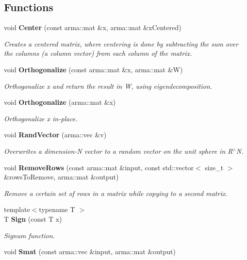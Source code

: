 \subsection*{Functions}
\begin{DoxyCompactItemize}
\item 
void \textbf{ Center} (const arma\+::mat \&x, arma\+::mat \&x\+Centered)
\begin{DoxyCompactList}\small\item\em Creates a centered matrix, where centering is done by subtracting the sum over the columns (a column vector) from each column of the matrix. \end{DoxyCompactList}\item 
void \textbf{ Orthogonalize} (const arma\+::mat \&x, arma\+::mat \&W)
\begin{DoxyCompactList}\small\item\em Orthogonalize x and return the result in W, using eigendecomposition. \end{DoxyCompactList}\item 
void \textbf{ Orthogonalize} (arma\+::mat \&x)
\begin{DoxyCompactList}\small\item\em Orthogonalize x in-\/place. \end{DoxyCompactList}\item 
void \textbf{ Rand\+Vector} (arma\+::vec \&v)
\begin{DoxyCompactList}\small\item\em Overwrites a dimension-\/N vector to a random vector on the unit sphere in R$^\wedge$N. \end{DoxyCompactList}\item 
void \textbf{ Remove\+Rows} (const arma\+::mat \&input, const std\+::vector$<$ size\+\_\+t $>$ \&rows\+To\+Remove, arma\+::mat \&output)
\begin{DoxyCompactList}\small\item\em Remove a certain set of rows in a matrix while copying to a second matrix. \end{DoxyCompactList}\item 
{\footnotesize template$<$typename T $>$ }\\T \textbf{ Sign} (const T x)
\begin{DoxyCompactList}\small\item\em Signum function. \end{DoxyCompactList}\item 
void \textbf{ Smat} (const arma\+::vec \&input, arma\+::mat \&output)

\end{DoxyCompactItemize}
